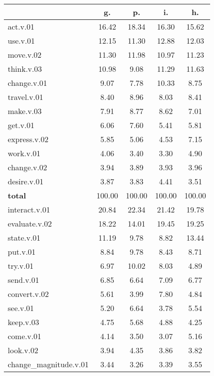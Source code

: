 \begin{table}[h!]
\begin{center}
\begin{tabular}{| l || c | c | c | c |}\hline
 & {\bf g.} & {\bf p.} & {\bf i.} & {\bf h.} \\\hline\hline
act.v.01 & 16.42  & 18.34  & 16.30  & 15.62 \\\hline
use.v.01 & 12.15  & 11.30  & 12.88  & 12.03 \\\hline
move.v.02 & 11.30  & 11.98  & 10.97  & 11.23 \\\hline
think.v.03 & 10.98  & 9.08  & 11.29  & 11.63 \\\hline
change.v.01 & 9.07  & 7.78  & 10.33  & 8.75 \\\hline
travel.v.01 & 8.40  & 8.96  & 8.03  & 8.41 \\\hline
make.v.03 & 7.91  & 8.77  & 8.62  & 7.01 \\\hline
get.v.01 & 6.06  & 7.60  & 5.41  & 5.81 \\\hline
express.v.02 & 5.85  & 5.06  & 4.53  & 7.15 \\\hline
work.v.01 & 4.06  & 3.40  & 3.30  & 4.90 \\\hline
change.v.02 & 3.94  & 3.89  & 3.93  & 3.96 \\\hline
desire.v.01 & 3.87  & 3.83  & 4.41  & 3.51 \\\hline\hline
{{\bf total}} & 100.00  & 100.00  & 100.00  & 100.00 \\\hline\hline\hline
interact.v.01 & 20.84  & 22.34  & 21.42  & 19.78 \\\hline
evaluate.v.02 & 18.22  & 14.01  & 19.45  & 19.25 \\\hline
state.v.01 & 11.19  & 9.78  & 8.82  & 13.44 \\\hline
put.v.01 & 8.84  & 9.78  & 8.43  & 8.71 \\\hline
try.v.01 & 6.97  & 10.02  & 8.03  & 4.89 \\\hline
send.v.01 & 6.85  & 6.64  & 7.09  & 6.77 \\\hline
convert.v.02 & 5.61  & 3.99  & 7.80  & 4.84 \\\hline
see.v.01 & 5.20  & 6.64  & 3.78  & 5.54 \\\hline
keep.v.03 & 4.75  & 5.68  & 4.88  & 4.25 \\\hline
come.v.01 & 4.14  & 3.50  & 3.07  & 5.16 \\\hline
look.v.02 & 3.94  & 4.35  & 3.86  & 3.82 \\\hline
change\_magnitude.v.01 & 3.44  & 3.26  & 3.39  & 3.55 \\\hline\hline

\end{tabular}
\end{center}
\end{table}
